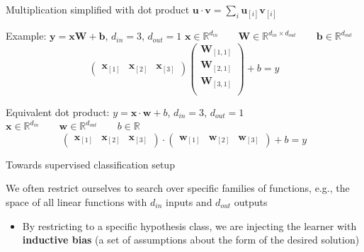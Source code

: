 \documentclass[12pt,aspectratio=169,handout]{beamer}
\begin{document}
\begin{frame}{Multiplication simplified with dot product $\bm{u} \cdot \bm{v} = \sum_i \bm{u}_{[i]} \bm{v}_{[i]}$}
	
\begin{block}{Example: $\bm{y} = \bm{x} \bm{W} + \bm{b}$, $d_{in} = 3$, $d_{out} = 1$}
$\bm{x} \in \mathbb{R}^{d_{in}} \qquad
\bm{W} \in \mathbb{R}^{d_{in} \times d_{out}} \qquad
\bm{b} \in \mathbb{R}^{d_{out}}$
	$$
	\begin{pmatrix}
		\bm{x}_{[1]} & \bm{x}_{[2]} & \bm{x}_{[3]}
	\end{pmatrix}
	\begin{pmatrix}
		\bm{W}_{[1,1]}  \\
		\bm{W}_{[2,1]}  \\
		\bm{W}_{[3,1]}  \\
	\end{pmatrix}
	+ b
	= y
	$$
\end{block}


\begin{block}{Equivalent dot product: $y = \bm{x} \cdot \bm{w} + b$, $d_{in} = 3$, $d_{out} = 1$}
$\bm{x} \in \mathbb{R}^{d_{in}} \qquad
\bm{w} \in \mathbb{R}^{d_{out}} \qquad
b \in \mathbb{R}$
	$$
	\begin{pmatrix}
		\bm{x}_{[1]} & \bm{x}_{[2]} & \bm{x}_{[3]}
	\end{pmatrix}
	\cdot
	\begin{pmatrix}
		\bm{w}_{[1]} & \bm{w}_{[2]} & \bm{w}_{[3]}
	\end{pmatrix}
	+ b
	= y
	$$
\end{block}

\end{frame}

\begin{frame}{Towards supervised classification setup}


We often restrict ourselves to search over specific families of functions, e.g., the space of all linear functions with $d_{in}$ inputs and $d_{out}$ outputs


\begin{itemize}
	\item By restricting to a specific hypothesis class, we are injecting the learner with \textbf{inductive bias} (a set of assumptions about the form of the desired solution)
\end{itemize}

\end{frame}
\end{document}
